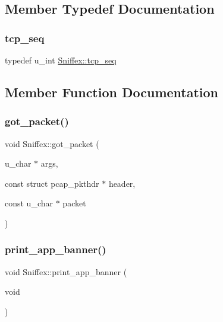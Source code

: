 \subsection{Member Typedef Documentation}
\mbox{\label{classSniffex_a83629f6a3ec687dd2bb381e9bf157d4f}} 
\subsubsection{\texorpdfstring{tcp\+\_\+seq}{tcp\_seq}}
{\footnotesize\ttfamily typedef u\+\_\+int \mbox{\hyperlink{classSniffex_a83629f6a3ec687dd2bb381e9bf157d4f}{Sniffex\+::tcp\+\_\+seq}}}



\subsection{Member Function Documentation}
\mbox{\label{classSniffex_a3d4ef3c90e55035eadca2d577004cd14}} 
\subsubsection{\texorpdfstring{got\+\_\+packet()}{got\_packet()}}
{\footnotesize\ttfamily void Sniffex\+::got\+\_\+packet (\begin{DoxyParamCaption}\item[{u\+\_\+char $\ast$}]{args,  }\item[{const struct pcap\+\_\+pkthdr $\ast$}]{header,  }\item[{const u\+\_\+char $\ast$}]{packet }\end{DoxyParamCaption})}

\mbox{\label{classSniffex_ab32951f576e7cd62caf4fe1c5b085b4e}} 
\subsubsection{\texorpdfstring{print\+\_\+app\+\_\+banner()}{print\_app\_banner()}}
{\footnotesize\ttfamily void Sniffex\+::print\+\_\+app\+\_\+banner (\begin{DoxyParamCaption}\item[{void}]{ }\end{DoxyParamCaption})}

